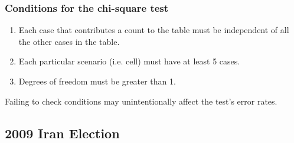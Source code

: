 \documentclass[slidestop,compress,mathserif]{beamer}
\begin{document}

\begin{frame}
\frametitle{Conditions for the chi-square test}

\begin{enumerate}

\item {} Each case that contributes a count to the table must be independent of all the other cases in the table.

\pause

\item {} Each particular scenario (i.e. cell) must have at least 5  cases.

\pause

\item {} Degrees of freedom must be greater than 1.

\end{enumerate}

\pause

Failing to check conditions may unintentionally affect the test's error rates.

\end{frame}


\subsection{2009 Iran Election}




\end{document}
